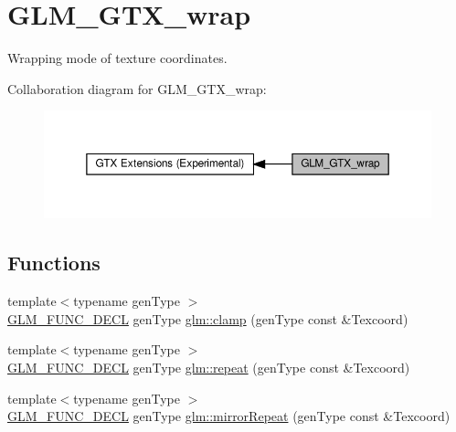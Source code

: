 \hypertarget{group__gtx__wrap}{}\section{G\+L\+M\+\_\+\+G\+T\+X\+\_\+wrap}
\label{group__gtx__wrap}


Wrapping mode of texture coordinates.  


Collaboration diagram for G\+L\+M\+\_\+\+G\+T\+X\+\_\+wrap\+:\nopagebreak
\begin{figure}[H]
\begin{center}
\leavevmode
\includegraphics[width=350pt]{group__gtx__wrap}
\end{center}
\end{figure}
\subsection*{Functions}
\begin{DoxyCompactItemize}
\item 
{\footnotesize template$<$typename gen\+Type $>$ }\\\hyperlink{setup_8hpp_ab2d052de21a70539923e9bcbf6e83a51}{G\+L\+M\+\_\+\+F\+U\+N\+C\+\_\+\+D\+E\+CL} gen\+Type \hyperlink{group__gtx__wrap_ga6c0cc6bd1d67ea1008d2592e998bad33}{glm\+::clamp} (gen\+Type const \&Texcoord)
\item 
{\footnotesize template$<$typename gen\+Type $>$ }\\\hyperlink{setup_8hpp_ab2d052de21a70539923e9bcbf6e83a51}{G\+L\+M\+\_\+\+F\+U\+N\+C\+\_\+\+D\+E\+CL} gen\+Type \hyperlink{group__gtx__wrap_ga809650c6310ea7c42666e918c117fb6f}{glm\+::repeat} (gen\+Type const \&Texcoord)
\item 
{\footnotesize template$<$typename gen\+Type $>$ }\\\hyperlink{setup_8hpp_ab2d052de21a70539923e9bcbf6e83a51}{G\+L\+M\+\_\+\+F\+U\+N\+C\+\_\+\+D\+E\+CL} gen\+Type \hyperlink{group__gtx__wrap_ga16a89b0661b60d5bea85137bbae74d73}{glm\+::mirror\+Repeat} (gen\+Type const \&Texcoord)
\end{DoxyCompactItemize}


